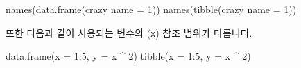 \documentclass[
]{book}
\newenvironment{Shaded}{\begin{snugshade}}{\end{snugshade}}
\newcommand{\AttributeTok}[1]{\textcolor[rgb]{0.77,0.63,0.00}{#1}}
\newcommand{\DecValTok}[1]{\textcolor[rgb]{0.00,0.00,0.81}{#1}}
\newcommand{\FunctionTok}[1]{\textcolor[rgb]{0.00,0.00,0.00}{#1}}
\newcommand{\NormalTok}[1]{#1}
\newcommand{\OtherTok}[1]{\textcolor[rgb]{0.56,0.35,0.01}{#1}}
\newcommand{\SpecialCharTok}[1]{\textcolor[rgb]{0.00,0.00,0.00}{#1}}
\newcommand{\StringTok}[1]{\textcolor[rgb]{0.31,0.60,0.02}{#1}}
\begin{document}
\begin{Shaded}
\begin{Highlighting}[]
\FunctionTok{names}\NormalTok{(}\FunctionTok{data.frame}\NormalTok{(}\StringTok{\textasciigrave{}}\AttributeTok{crazy name}\StringTok{\textasciigrave{}} \OtherTok{=} \DecValTok{1}\NormalTok{))}
\FunctionTok{names}\NormalTok{(}\FunctionTok{tibble}\NormalTok{(}\StringTok{\textasciigrave{}}\AttributeTok{crazy name}\StringTok{\textasciigrave{}} \OtherTok{=} \DecValTok{1}\NormalTok{))}
\end{Highlighting}
\end{Shaded}

또한 다음과 같이 사용되는 변수의 (\texttt{x}) 참조 범위가 다릅니다.

\begin{Shaded}
\begin{Highlighting}[]

\FunctionTok{data.frame}\NormalTok{(}\AttributeTok{x =} \DecValTok{1}\SpecialCharTok{:}\DecValTok{5}\NormalTok{, }\AttributeTok{y =}\NormalTok{ x }\SpecialCharTok{\^{}} \DecValTok{2}\NormalTok{)}
\FunctionTok{tibble}\NormalTok{(}\AttributeTok{x =} \DecValTok{1}\SpecialCharTok{:}\DecValTok{5}\NormalTok{, }\AttributeTok{y =}\NormalTok{ x }\SpecialCharTok{\^{}} \DecValTok{2}\NormalTok{)}
\end{Highlighting}
\end{Shaded}

\begin{Shaded}
\end{Shaded}
\end{document}
